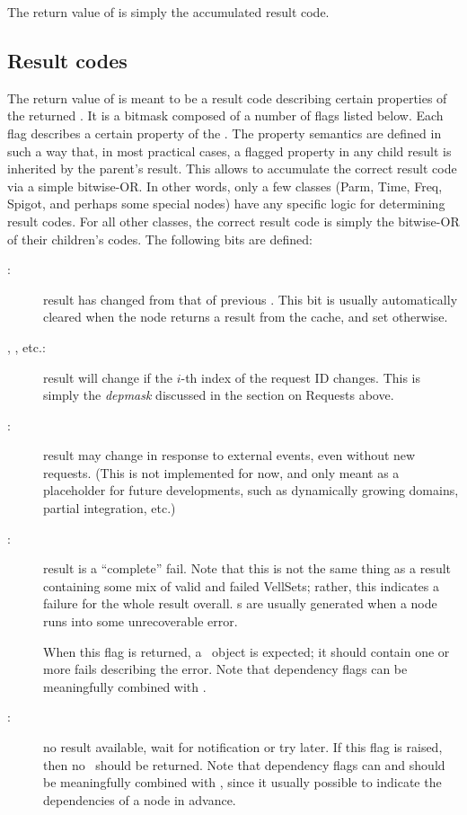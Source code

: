 \documentclass[10pt]{article}
\begin{document}
  The return value of  is simply the accumulated result code.
  
\subsection{Result codes}

  The return value of  is meant to be a result code describing
  certain properties  of the returned \Result. It is a bitmask composed of a
  number of flags listed below. Each flag describes a certain property of the
  \Result. The property semantics are defined in such a way that, in most
  practical cases, a flagged property in any child result is inherited by the
  parent's result. This allows  to accumulate the correct result
  code via a simple bitwise-OR. In other words, only a few classes (Parm, Time,
  Freq, Spigot, and perhaps some special nodes) have any specific logic for
  determining result codes. For all other classes, the correct result code is
  simply the bitwise-OR of their children's codes. The following bits are
  defined:
  
  \begin{description}
  
  \item[:] result has changed from that of previous \Request. This
    bit is usually automatically cleared when the node returns a result 
    from the cache, and set otherwise.
     
  \item[, , etc.:] result will change if the $i$-th
    index of the request ID changes. This is simply the {\em depmask\/} discussed
    in the section on Requests above.

  \item[:] result may change in response to external events,
    even without new requests. (This is not implemented for now, and only meant
    as a placeholder for future developments, such as dynamically growing
    domains, partial integration, etc.)

  \item[:] result is a ``complete'' fail. Note that this is not the
    same thing as a result containing some mix of valid and failed VellSets;
    rather, this indicates a failure for the whole result overall. s
    are usually generated when a node runs into some unrecoverable error.
    
    When this flag is returned, a \Result\ object is expected; it should
    contain one or more fails describing the error. Note that dependency flags
    can be meaningfully combined with .

  \item[:] no result available, wait for notification or try later.
    If this flag is raised, then no \Result\ should be returned. Note that
    dependency flags can and should be meaningfully combined with ,
    since it usually possible to indicate the dependencies of a node in
    advance.

  \end{description}
  
\end{document}
